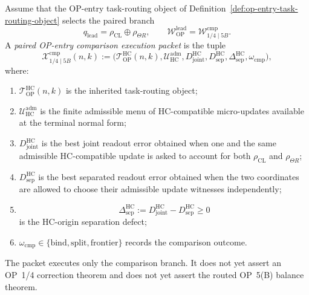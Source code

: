 \begin{definition}
\label{def:paired-op-entry-comparison-execution-packet}
Assume that the OP-entry task-routing object of Definition~\ref{def:op-entry-task-routing-object} selects the paired branch
\[
  q_{\mathrm{lead}}=\rho_{\mathrm{CL}}\oplus\rho_{\Theta R},
  \qquad
  \mathcal W_{\mathrm{OP}}^{\mathrm{lead}}
  =\mathcal W_{1/4\mid 5B}^{\mathrm{cmp}}.
\]
A \emph{paired OP-entry comparison execution packet} is the tuple
\[
  \mathcal X_{1/4\mid 5B}^{\mathrm{cmp}}(n,k)
  :=
  \bigl(
    \mathcal T_{\mathrm{OP}}^{\mathrm{HC}}(n,k),
    \mathcal U_{\mathrm{HC}}^{\mathrm{adm}},
    D_{\mathrm{joint}}^{\mathrm{HC}},
    D_{\mathrm{sep}}^{\mathrm{HC}},
    \Delta_{\mathrm{sep}}^{\mathrm{HC}},
    \omega_{\mathrm{cmp}}
  \bigr),
\]
where:
\begin{enumerate}[leftmargin=2em,label=(\alph*)]
  \item $\mathcal T_{\mathrm{OP}}^{\mathrm{HC}}(n,k)$ is the inherited task-routing object;
  \item $\mathcal U_{\mathrm{HC}}^{\mathrm{adm}}$ is the finite admissible menu of HC-compatible micro-updates available at the terminal normal form;
  \item $D_{\mathrm{joint}}^{\mathrm{HC}}$ is the best joint readout error obtained when one and the same admissible HC-compatible update is asked to account for both $\rho_{\mathrm{CL}}$ and $\rho_{\Theta R}$;
  \item $D_{\mathrm{sep}}^{\mathrm{HC}}$ is the best separated readout error obtained when the two coordinates are allowed to choose their admissible update witnesses independently;
  \item
  \[
    \Delta_{\mathrm{sep}}^{\mathrm{HC}}
    :=D_{\mathrm{joint}}^{\mathrm{HC}}-D_{\mathrm{sep}}^{\mathrm{HC}}
    \geq 0
  \]
  is the HC-origin separation defect;
  \item $\omega_{\mathrm{cmp}}\in\{\mathrm{bind},\mathrm{split},\mathrm{frontier}\}$ records the comparison outcome.
\end{enumerate}
The packet executes only the comparison branch.  It does not yet assert an OP~1/4 correction theorem and does not yet assert the routed OP~5(B) balance theorem.
\end{definition}

